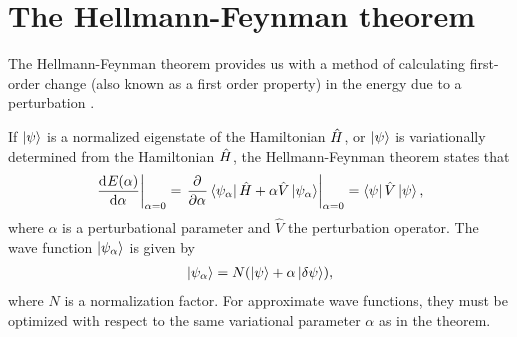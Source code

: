     \section{The Hellmann-Feynman theorem}
        The Hellmann-Feynman theorem provides us with a method of calculating
        first-order change (also known as a first order property) in the energy
        due to a perturbation \cite{helgaker-molecular}.
        \begin{theorem}
            If $\ket{\psi}$ is a normalized eigenstate of the Hamiltonian
            $\hat{H}$, or $\ket{\psi}$ is variationally determined from the
            Hamiltonian $\hat{H}$, the Hellmann-Feynman theorem \cite{feynman}
            states that
            \begin{align}
                \left.\dod[]{E(\alpha)}{\alpha}\right\rvert_{\alpha = 0}
                =
                \left.
                \dpd[]{}{\alpha}
                \bra{\psi_{\alpha}}\hamil + \alpha\hat{V}\ket{\psi_{\alpha}}
                \right\rvert_{\alpha = 0}
                = \bra{\psi}\hat{V}\ket{\psi},
                \label{eq:hellmann-feynman}
            \end{align}
            where $\alpha$ is a perturbational parameter and $\hat{V}$ the
            perturbation operator.
            The wave function $\ket{\psi_{\alpha}}$ is given by
            \begin{align}
                \ket{\psi_{\alpha}} = N(\ket{\psi} + \alpha\ket{\delta\psi}),
            \end{align}
            where $N$ is a normalization factor.
            For approximate wave functions, they must be optimized with respect
            to the same variational parameter $\alpha$ as in the theorem.
        \end{theorem}
